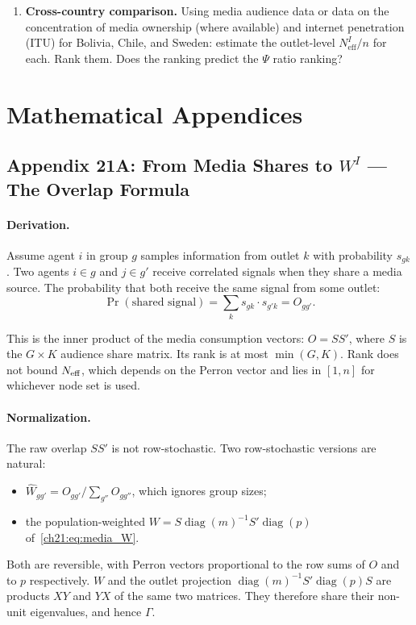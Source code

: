 \documentclass[../structural_economics_book.tex]{subfiles}
\begin{document}
\begin{enumerate}[label=\textbf{21.\arabic*}, leftmargin=3em]
\item \textbf{Cross-country comparison.} Using media audience data or data on the concentration of media ownership (where available) and internet penetration (ITU) for Bolivia, Chile, and Sweden: estimate the outlet-level $N_{\text{eff}}^I/n$ for each. Rank them. Does the ranking predict the $\Psi$ ratio ranking?
\end{enumerate}


\newpage
\section*{Mathematical Appendices}


\subsection*{Appendix 21A: From Media Shares to $W^I$ --- The Overlap Formula}
\label{ch21:app:overlap}

\paragraph{Derivation.} Assume agent $i$ in group $g$ samples information from outlet $k$ with probability $s_{gk}$. Two agents $i \in g$ and $j \in g'$ receive correlated signals when they share a media source. The probability that both receive the same signal from some outlet:
\begin{equation}
\Pr(\text{shared signal}) = \sum_k s_{gk} \cdot s_{g'k} = O_{gg'}.
\end{equation}

This is the inner product of the media consumption vectors: $O = S S'$, where $S$ is the $G \times K$ audience share matrix. Its rank is at most $\min(G, K)$. Rank does not bound $N_{\text{eff}}$, which depends on the Perron vector and lies in $[1, n]$ for whichever node set is used.

\paragraph{Normalization.} The raw overlap $SS'$ is not row-stochastic. Two row-stochastic versions are natural:
\begin{itemize}
\item $\hat{W}_{gg'} = O_{gg'} / \sum_{g''} O_{gg''}$, which ignores group sizes;
\item the population-weighted $W = S\operatorname{diag}(m)^{-1}S'\operatorname{diag}(p)$ of~\eqref{ch21:eq:media_W}.
\end{itemize}
Both are reversible, with Perron vectors proportional to the row sums of $O$ and to $p$ respectively. $W$ and the outlet projection $\operatorname{diag}(m)^{-1}S'\operatorname{diag}(p)S$ are products $XY$ and $YX$ of the same two matrices. They therefore share their non-unit eigenvalues, and hence $\Gamma$.
\end{document}
